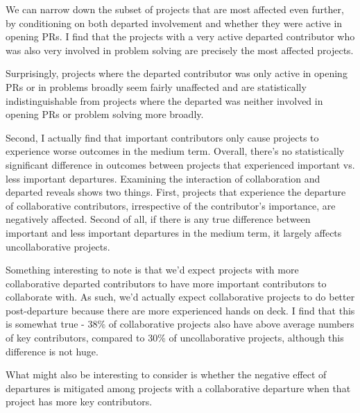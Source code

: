 \documentclass[12pt,notitlepage]{article}
\begin{document}
We can narrow down the subset of projects that are most affected even further, by conditioning on both departed involvement and whether they were active in opening PRs. I find that the projects with a very active departed contributor who was also very involved in problem solving are precisely the most affected projects. 

Surprisingly, projects where the departed contributor was only active in opening PRs or in problems broadly seem fairly unaffected and are statistically indistinguishable from projects where the departed was neither involved in opening PRs or problem solving more broadly. 


Second, I actually find that important contributors only
cause projects to experience worse outcomes in the medium term. Overall, there's no statistically significant difference in outcomes between projects that experienced important vs. less important departures. Examining the interaction of collaboration and departed reveals shows two things. First, projects that experience the departure of collaborative contributors, irrespective of the contributor's importance, are negatively affected. Second of all, if there is any true difference between important and less important departures in the medium term, it largely affects uncollaborative projects. 



Something interesting to note is that we'd expect projects with more collaborative departed contributors to have more important contributors to collaborate with. As such, we'd actually expect collaborative projects to do better post-departure because there are more experienced hands on deck. I find that this is somewhat true - 38\% of collaborative projects also have above average numbers of key contributors, compared to 30\% of uncollaborative projects, although this difference is not huge. 

What might also be interesting to consider is whether the negative effect of departures is mitigated among projects with a collaborative departure when that project has more key contributors. 
\end{document}
